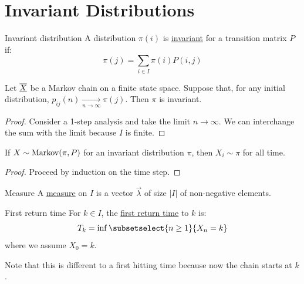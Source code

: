 \documentclass[../Main.tex]{subfiles}
\begin{document}
\section{Invariant Distributions}
\begin{definition}{Invariant distribution}
    A distribution $\pi(i)$ is \underline{invariant} for a transition matrix $P$ if:
    \begin{equation*}
        \pi(j) = \sum_{i \in I} \pi(i) P(i, j)
    \end{equation*}
\end{definition}
\begin{proposition}
    Let $\underline{\overline{X}}$ be a Markov chain on a finite state space. Suppose that, for any initial distribution, $p_{ij}(n) \xrightarrow[n \to \infty]{} \pi(j)$. Then $\pi$ is invariant.
    \label{propLimitDistIsInv}
\end{proposition}
\begin{proof}
    Consider a 1-step analysis and take the limit $n \to \infty$. We can interchange the sum with the limit because $I$ is finite.
\end{proof}
\begin{proposition}
    If $X \sim \operatorname{Markov}(\pi, P)$ for an invariant distribution $\pi$, then $X_i \sim \pi$ for all time.
    \label{propStartWithInvDist}
\end{proposition}
\begin{proof}
    Proceed by induction on the time step.
\end{proof}
\begin{definition}{Measure}
    A \underline{measure} on $I$ is a vector $\vec{\lambda}$ of size $|I|$ of non-negative elements.
\end{definition}
\begin{definition}{First return time}
    For $k \in I$, the \underline{first return time} to $k$ is:
    \begin{equation*}
        T_k = \inf \subsetselect{n \geq 1}{X_n = k}
    \end{equation*}
    where we assume $X_0 = k$.
\end{definition}
Note that this is different to a first hitting time because now the chain starts at $k$.
\end{document}
